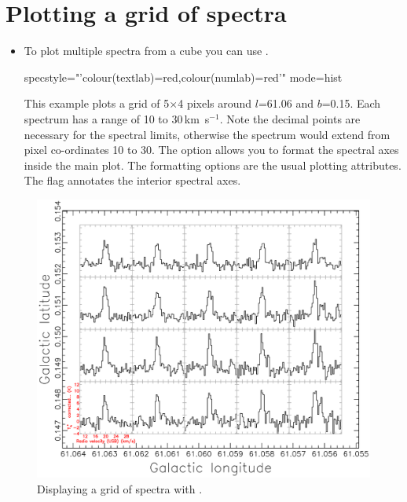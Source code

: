 \documentclass[11pt,oneside,chapters]{starlink}
\newcommand{\udeg}{\hspace{-0.3em}\dgs\hspace{-0.08em}}
\newcommand{\kms}{\mbox{$\,$km~s$^{-1}$}}   %
\newcommand{\udeg}{\HCode{&deg}}
\newcommand{\kms}{\,km~s$^{-1}$}   %
\begin{document}
\section{Plotting a grid of spectra}
\begin{itemize}
\item To plot multiple spectra from a cube you can use \clinplot.

\begin{terminalv}
  specstyle="'colour(textlab)=red,colour(numlab)=red'" mode=hist
\end{terminalv}

This example plots a grid of 5$\times$4 pixels around $l$=61.\udeg06
and $b$=0.\udeg15. Each spectrum has a range of 10 to 30\kms.  Note
the decimal points are necessary for the spectral limits, otherwise
the spectrum would extend from pixel co-ordinates 10 to 30.  The
 option allows you to format the spectral axes inside
the main plot. The formatting options are the usual plotting
attributes.  The flag  annotates the interior spectral
axes.

\end{itemize}

\begin{figure}[h!]
\begin{center}
\includegraphics[width=0.9\linewidth]{sc20_clinplot}
\caption[Displaying a grid of spectra with \clinplot.]{\label{fig:display6}
  Displaying a grid of spectra with \clinplot.}
\end{center}
\end{figure}
\end{document}
